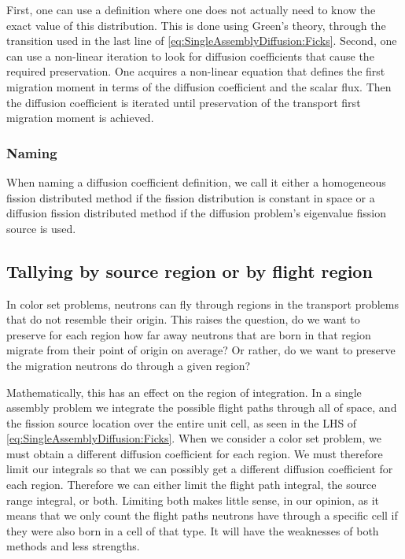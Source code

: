 \documentclass[a4paper,letterpaper,12pt,oneside,draft]{article}
\begin{document}
First, one can use a definition where one does not actually need to know the exact value of this distribution.
This is done using Green's theory, through the transition used in the last line of \cref{eq:SingleAssemblyDiffusion:Ficks}.
Second, one can use a non-linear iteration to look for diffusion coefficients that cause the required preservation.
One acquires a non-linear equation that defines the first migration moment in terms of the diffusion coefficient and the scalar flux.
Then the diffusion coefficient is iterated until preservation of the transport first migration moment is achieved.

\subsubsection*{Naming}
When naming a diffusion coefficient definition, we call it either a homogeneous fission distributed method if the fission distribution is constant in space or a diffusion fission distributed method if the diffusion problem's eigenvalue fission source is used.

\subsection{Tallying by source region or by flight region}
In color set problems, neutrons can fly through regions in the transport problems that do not resemble their origin.
This raises the question, do we want to preserve for each region how far away neutrons that are born in that region migrate from their point of origin on average?
Or rather, do we want to preserve the migration neutrons do through a given region?

Mathematically, this has an effect on the region of integration.
In a single assembly problem we integrate the possible flight paths through all of space, and the fission source location over the entire unit cell, as seen in the LHS of \cref{eq:SingleAssemblyDiffusion:Ficks}.
When we consider a color set problem, we must obtain a different diffusion coefficient for each region. We must therefore limit our integrals so that we can possibly get a different diffusion coefficient for each region.
Therefore we can either limit the flight path integral, the source range integral, or both.
Limiting both makes little sense, in our opinion, as it means that we only count the flight paths neutrons have through a specific cell if they were also born in a cell of that type.
It will have the weaknesses of both methods and less strengths.
\end{document}
